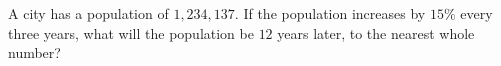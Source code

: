 A city has a population of $1{,}234{,}137$. If the population increases by $15\%$ every three years, what will the population be $12$ years later, to the nearest whole number?
